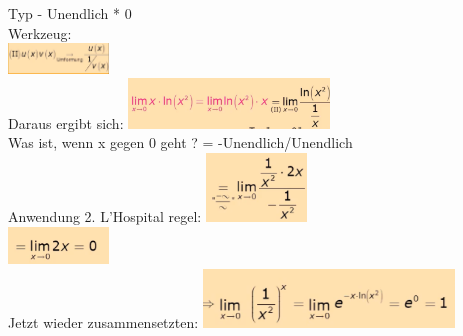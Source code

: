 \documentclass[12pt,a4paper]{article}
\begin{document}
Typ - Unendlich * 0\\
\newpage
Werkzeug:\\
\includegraphics[width=0.2\textwidth]{BIlder/S1/13.png}\\
Daraus ergibt sich:
\includegraphics[width=0.4\textwidth]{BIlder/S1/14.png}\\
Was ist, wenn x gegen 0 geht ? = -Unendlich/Unendlich\\
Anwendung 2. L'Hospital regel:
\includegraphics[width=0.2\textwidth]{BIlder/S1/15.png}\\
\includegraphics[width=0.2\textwidth]{BIlder/S1/16.png}\\
Jetzt wieder zusammensetzten:
\includegraphics[width=0.5\textwidth]{BIlder/S1/17.png}\\
\end{document}
